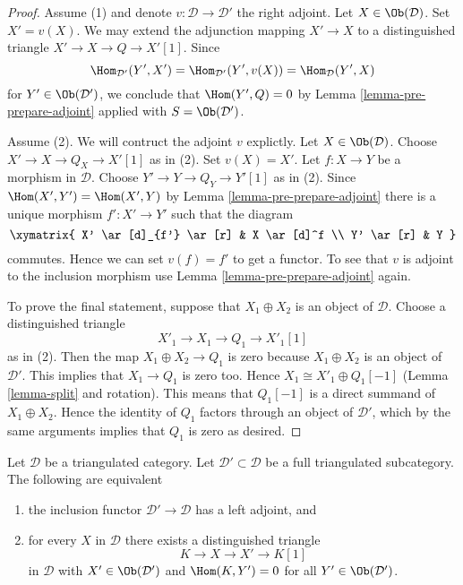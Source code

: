 \begin{proof}
Assume (1) and denote $v : \mathcal{D} \to \mathcal{D}'$ the right adjoint.
Let $X \in \Ob(\mathcal{D})$. Set $X' = v(X)$. We may extend the
adjunction mapping $X' \to X$ to a distinguished triangle
$X' \to X \to Q \to X'[1]$. Since
$$
\Hom_{\mathcal{D}'}(Y', X') =
\Hom_{\mathcal{D}'}(Y', v(X)) =
\Hom_\mathcal{D}(Y', X)
$$
for $Y' \in \Ob(\mathcal{D}')$, we conclude that $\Hom(Y', Q) = 0$
by Lemma \ref{lemma-pre-prepare-adjoint} applied with $S = \Ob(\mathcal{D}')$.

\medskip\noindent
Assume (2). We will contruct the adjoint $v$ explictly.
Let $X \in \Ob(\mathcal{D})$. Choose $X' \to X \to Q_X \to X'[1]$ as in (2).
Set $v(X) = X'$. Let $f : X \to Y$ be a morphism in $\mathcal{D}$.
Choose $Y' \to Y \to Q_Y \to Y'[1]$ as in (2). Since
$\Hom(X', Y') = \Hom(X', Y)$ by Lemma \ref{lemma-pre-prepare-adjoint}
there is a unique morphism $f' : X' \to Y'$ such that the diagram
$$
\xymatrix{
X' \ar[d]_{f'} \ar[r] & X \ar[d]^f \\
Y' \ar[r] & Y
}
$$
commutes. Hence we can set $v(f) = f'$ to get a functor.
To see that $v$ is adjoint to the inclusion morphism use
Lemma \ref{lemma-pre-prepare-adjoint} again.

\medskip\noindent
To prove the final statement, suppose that $X_1 \oplus X_2$
is an object of $\mathcal{D}$. Choose a distinguished triangle
$$
X'_1 \to X_1 \to Q_1 \to X'_1[1]
$$
as in (2). Then the map $X_1 \oplus X_2 \to Q_1$ is zero
because $X_1 \oplus X_2$ is an object of $\mathcal{D}'$.
This implies that $X_1 \to Q_1$ is zero too. Hence
$X_1 \cong X'_1 \oplus Q_1[-1]$ (Lemma \ref{lemma-split} and rotation).
This means that $Q_1[-1]$ is a direct summand of $X_1 \oplus X_2$.
Hence the identity of $Q_1$ factors through an object of $\mathcal{D}'$,
which by the same arguments implies that $Q_1$ is zero as desired.
\end{proof}

\begin{lemma}
\label{lemma-left-adjoint}
Let $\mathcal{D}$ be a triangulated category. Let
$\mathcal{D}' \subset \mathcal{D}$ be a full triangulated subcategory.
The following are equivalent
\begin{enumerate}
\item the inclusion functor $\mathcal{D}' \to \mathcal{D}$
has a left adjoint, and
\item for every $X$ in $\mathcal{D}$ there exists a distinguished
triangle
$$
K \to X \to X' \to K[1]
$$
in $\mathcal{D}$ with $X' \in \Ob(\mathcal{D}')$ and
$\Hom(K, Y') = 0$ for all $Y' \in \Ob(\mathcal{D}')$.
\end{enumerate}
\end{lemma}

